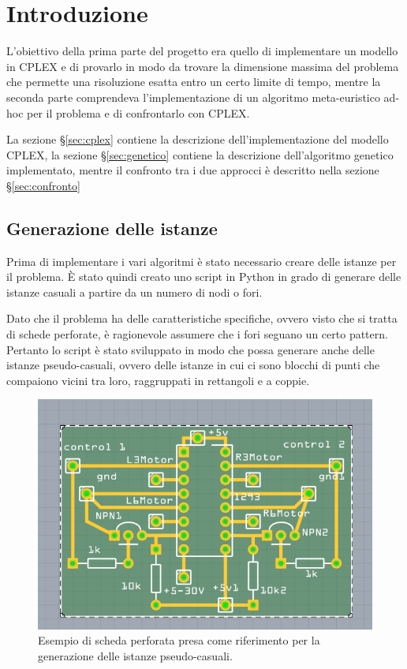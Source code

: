 
\section{Introduzione}

L'obiettivo della prima parte del progetto era quello di implementare un modello in CPLEX e di provarlo in modo da trovare la dimensione massima del problema che permette una risoluzione esatta entro un certo limite di tempo, mentre la seconda parte comprendeva l'implementazione di un algoritmo meta-euristico ad-hoc per il problema e di confrontarlo con CPLEX.

La sezione §\ref{sec:cplex} contiene la descrizione dell'implementazione del modello CPLEX, la sezione §\ref{sec:genetico} contiene la descrizione dell'algoritmo genetico implementato, mentre il confronto tra i due approcci è descritto nella sezione §\ref{sec:confronto}

\subsection{Generazione delle istanze}

Prima di implementare i vari algoritmi è stato necessario creare delle istanze per il problema.
\`E stato quindi creato uno script in Python in grado di generare delle istanze casuali a partire da un numero di nodi o fori.

Dato che il problema ha delle caratteristiche specifiche, ovvero visto che si tratta di schede perforate, è ragionevole assumere che i fori seguano un certo pattern.
Pertanto lo script è stato sviluppato in modo che possa generare anche delle istanze pseudo-casuali, ovvero delle istanze in cui ci sono blocchi di punti che compaiono vicini tra loro, raggruppati in rettangoli e a coppie.

\begin{figure}[htbp]
	\centering
	\includegraphics[width=.5\textwidth]{immagini/scheda.png}
	\caption{Esempio di scheda perforata presa come riferimento per la generazione delle istanze pseudo-casuali.}
\end{figure}